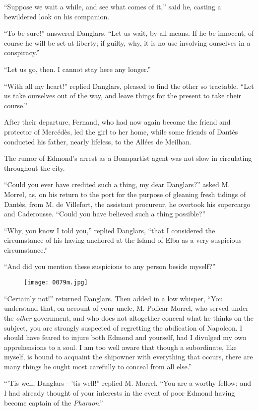 “Suppose we wait a while, and see what comes of it,” said he, casting a
bewildered look on his companion.

“To be sure!” answered Danglars. “Let us wait, by all means. If he be
innocent, of course he will be set at liberty; if guilty, why, it is no
use involving ourselves in a conspiracy.”

“Let us go, then. I cannot stay here any longer.”

“With all my heart!” replied Danglars, pleased to find the other so
tractable. “Let us take ourselves out of the way, and leave things for
the present to take their course.”

After their departure, Fernand, who had now again become the friend and
protector of Mercédès, led the girl to her home, while some friends of
Dantès conducted his father, nearly lifeless, to the Allées de Meilhan.

The rumor of Edmond’s arrest as a Bonapartist agent was not slow in
circulating throughout the city.

“Could you ever have credited such a thing, my dear Danglars?” asked M.
Morrel, as, on his return to the port for the purpose of gleaning fresh
tidings of Dantès, from M. de Villefort, the assistant procureur, he
overtook his supercargo and Caderousse. “Could you have believed such a
thing possible?”

“Why, you know I told you,” replied Danglars, “that I considered the
circumstance of his having anchored at the Island of Elba as a very
suspicious circumstance.”

“And did you mention these suspicions to any person beside myself?”

\begin{figure}[ht]
\texttt{[image: 0079m.jpg]}
\end{figure}

“Certainly not!” returned Danglars. Then added in a low whisper, “You
understand that, on account of your uncle, M. Policar Morrel, who
served under the \textit{other} government, and who does not altogether
conceal what he thinks on the subject, you are strongly suspected of
regretting the abdication of Napoleon. I should have feared to injure
both Edmond and yourself, had I divulged my own apprehensions to a
soul. I am too well aware that though a subordinate, like myself, is
bound to acquaint the shipowner with everything that occurs, there are
many things he ought most carefully to conceal from all else.”

“’Tis well, Danglars—’tis well!” replied M. Morrel. “You are a worthy
fellow; and I had already thought of your interests in the event of
poor Edmond having become captain of the \textit{Pharaon}.”

